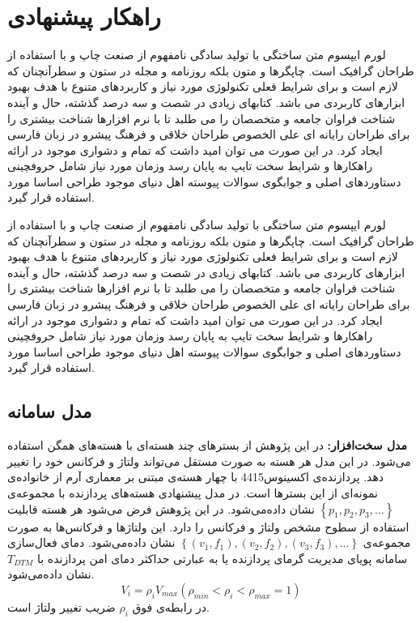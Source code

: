 \section{راهکار پیشنهادی}
\label{sec:solution}
لورم ایپسوم متن ساختگی با تولید سادگی نامفهوم از صنعت چاپ و با استفاده از طراحان گرافیک است. چاپگرها و متون بلکه روزنامه و مجله در ستون و سطرآنچنان که لازم است و برای شرایط فعلی تکنولوژی مورد نیاز و کاربردهای متنوع با هدف بهبود ابزارهای کاربردی می باشد. کتابهای زیادی در شصت و سه درصد گذشته، حال و آینده شناخت فراوان جامعه و متخصصان را می طلبد تا با نرم افزارها شناخت بیشتری را برای طراحان رایانه ای علی الخصوص طراحان خلاقی و فرهنگ پیشرو در زبان فارسی ایجاد کرد. در این صورت می توان امید داشت که تمام و دشواری موجود در ارائه راهکارها و شرایط سخت تایپ به پایان رسد وزمان مورد نیاز شامل حروفچینی دستاوردهای اصلی و جوابگوی سوالات پیوسته اهل دنیای موجود طراحی اساسا مورد استفاده قرار گیرد.

لورم ایپسوم متن ساختگی با تولید سادگی نامفهوم از صنعت چاپ و با استفاده از طراحان گرافیک است. چاپگرها و متون بلکه روزنامه و مجله در ستون و سطرآنچنان که لازم است و برای شرایط فعلی تکنولوژی مورد نیاز و کاربردهای متنوع با هدف بهبود ابزارهای کاربردی می باشد. کتابهای زیادی در شصت و سه درصد گذشته، حال و آینده شناخت فراوان جامعه و متخصصان را می طلبد تا با نرم افزارها شناخت بیشتری را برای طراحان رایانه ای علی الخصوص طراحان خلاقی و فرهنگ پیشرو در زبان فارسی ایجاد کرد. در این صورت می توان امید داشت که تمام و دشواری موجود در ارائه راهکارها و شرایط سخت تایپ به پایان رسد وزمان مورد نیاز شامل حروفچینی دستاوردهای اصلی و جوابگوی سوالات پیوسته اهل دنیای موجود طراحی اساسا مورد استفاده قرار گیرد.

\subsection{مدل سامانه}
\textbf{مدل سخت‌افزار:}
در این پژوهش از بستر‌های چند‌ هسته‌ای با هسته‌های همگن استفاده می‌شود. در این مدل هر هسته به صورت مستقل می‌تواند ولتاژ و فرکانس خود را تغییر دهد. پردازنده‌ی اکسینوس4415 با چهار هسته‌ی مبتنی بر معماری آرم از خانواده‌ی  نمونه‌ای از این بستر‌ها است. در مدل پیشنهادی هسته‌های پردازنده با مجموعه‌ی $\left \{p_1,p_2,p_3,...\right \}$ نشان داده‌می‌شود. در این پژوهش فرض می‌شود هر هسته قابلیت استفاده از سطوح مشخص ولتاژ و فرکانس را دارد. این ولتاژها و فرکانس‌ها به صورت مجموعه‌ی $\left \{(v_1,f_1),(v_2,f_2),(v_3,f_3),...\right \}$ نشان داده‌می‌شود. دمای فعال‌سازی سامانه پویای مدیریت گرمای پردازنده یا به عبارتی حداکثر دمای امن پردازنده با $T_{DTM}$ نشان داده‌می‌شود.\\
\begin{equation}
\label{eq:voltage_scale}
V_i=\rho _iV_{max} (\rho _{min}< \rho _i<\rho _{max}=1 )
\end{equation}
در رابطه‌ی فوق $\rho _i$ ضریب تغییر ولتاژ است.
